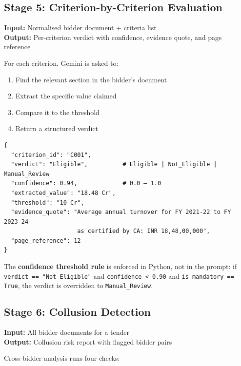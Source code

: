 \documentclass[12pt,a4paper]{article}
\begin{document}
\subsection{Stage 5: Criterion-by-Criterion Evaluation}

\textbf{Input:} Normalised bidder document + criteria list \\
\textbf{Output:} Per-criterion verdict with confidence, evidence quote, and page reference

For each criterion, Gemini is asked to:
\begin{enumerate}
\item Find the relevant section in the bidder's document
\item Extract the specific value claimed
\item Compare it to the threshold
\item Return a structured verdict
\end{enumerate}

\begin{lstlisting}[style=pythonstyle, caption={Verdict structure returned by Gemini}]
{
  "criterion_id": "C001",
  "verdict": "Eligible",          # Eligible | Not_Eligible | Manual_Review
  "confidence": 0.94,             # 0.0 – 1.0
  "extracted_value": "18.48 Cr",
  "threshold": "10 Cr",
  "evidence_quote": "Average annual turnover for FY 2021-22 to FY 2023-24
                     as certified by CA: INR 18,48,00,000",
  "page_reference": 12
}
\end{lstlisting}

The \textbf{confidence threshold rule} is enforced in Python, not in the prompt:
if \texttt{verdict == "Not\_Eligible"} and \texttt{confidence < 0.90} and
\texttt{is\_mandatory == True}, the verdict is overridden to \texttt{Manual\_Review}.

\subsection{Stage 6: Collusion Detection}

\textbf{Input:} All bidder documents for a tender \\
\textbf{Output:} Collusion risk report with flagged bidder pairs

Cross-bidder analysis runs four checks:
\end{document}

